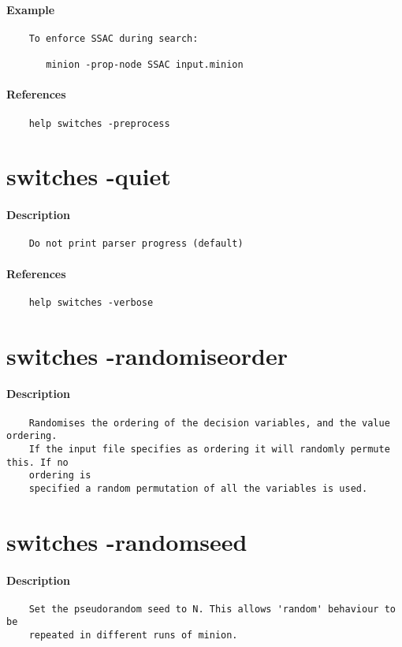 \paragraph{Example}
{\footnotesize
\begin{verbatim}
    To enforce SSAC during search:

       minion -prop-node SSAC input.minion
\end{verbatim}
}
\paragraph{References}
{\footnotesize
\begin{verbatim}
    help switches -preprocess
\end{verbatim}
}
\section{switches -quiet}
\paragraph{Description}
{\footnotesize
\begin{verbatim}
    Do not print parser progress (default)
\end{verbatim}
}
\paragraph{References}
{\footnotesize
\begin{verbatim}
    help switches -verbose
\end{verbatim}
}
\section{switches -randomiseorder}
\paragraph{Description}
{\footnotesize
\begin{verbatim}
    Randomises the ordering of the decision variables, and the value ordering.
    If the input file specifies as ordering it will randomly permute this. If no
    ordering is
    specified a random permutation of all the variables is used.
\end{verbatim}
}
\section{switches -randomseed}
\paragraph{Description}
{\footnotesize
\begin{verbatim}
    Set the pseudorandom seed to N. This allows 'random' behaviour to be
    repeated in different runs of minion.
\end{verbatim}
}
